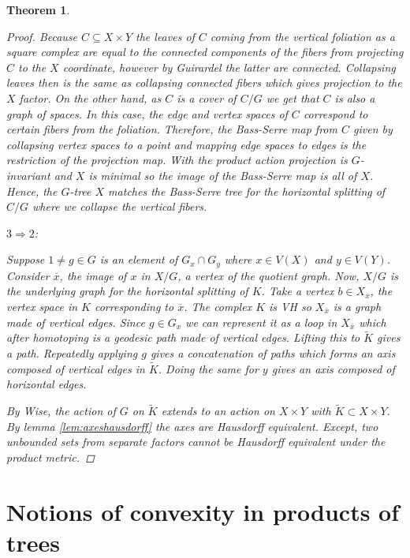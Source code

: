 \documentclass[12pt,parskip=full]{report}
\theoremstyle{plain}
\newtheorem{thm}{Theorem}[section]
\theoremstyle{definition}
\begin{document}
\begin{thm}
\begin{proof}
    Because $C\subseteq X\times Y$ the leaves of $C$ coming from the vertical foliation as a square complex are equal to the connected components of the fibers from projecting $C$ to the $X$ coordinate, however by Guirardel the latter are connected. Collapsing leaves then is the same as collapsing connected fibers which gives projection to the $X$ factor. On the other hand, as \(C\) is a cover of \(C/G\) we get that \(C\) is also a graph of spaces. In this case, the edge and vertex spaces of \(C\) correspond to certain fibers from the foliation. Therefore, the Bass-Serre map from \(C\) given by collapsing vertex spaces to a point and mapping edge spaces to edges is the restriction of the projection map. With the product action projection is \(G\)-invariant and \(X\) is minimal so the image of the Bass-Serre map is all of \(X\). Hence, the \(G\)-tree \(X\) matches the Bass-Serre tree for the horizontal splitting of \(C/G\) where we collapse the vertical fibers.
    
    
\item $3\Rightarrow 2$: 
    

    Suppose $1\neq g \in G$ is an element of $G_x\cap G_y$ where $x \in V(X)$ and $y\in V(Y)$. Consider $\overline{x}$, the image of $x$ in $X/G$, a vertex of the quotient graph. Now, $X/G$ is the underlying graph for the horizontal splitting of $K$. Take a vertex $b \in X_{\overline{x}}$, the vertex space in $K$ corresponding to $\overline{x}$. The complex $K$ is VH so $X_{\overline{x}}$ is a graph made of vertical edges. Since $g\in G_x$ we can represent it as a loop in $X_{\overline{x}}$  which after homotoping is a geodesic path made of vertical edges. Lifting this to $\widetilde{K}$ gives a path. Repeatedly applying $g$ gives a concatenation of paths which forms an axis composed of vertical edges in $\widetilde{K}$. Doing the same for $y$ gives an axis composed of horizontal edges. 
    
    
    By Wise, the action of $G$ on $\widetilde{K}$ extends to an action on $X \times Y$ with $\widetilde{K}\subset X\times Y$. By lemma \ref{lem:axeshausdorff} the axes are Hausdorff equivalent. Except, two unbounded sets from separate factors cannot be Hausdorff equivalent under the product metric.
    
\end{proof}
\end{thm}


\chapter{Notions of convexity in products of trees}
\end{document}
